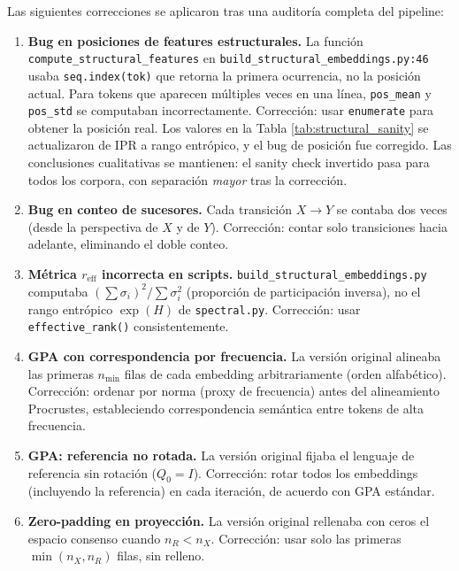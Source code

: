 \documentclass[11pt,a4paper]{article}
\newcommand{\1}{\mathbf{1}}
\numberwithin{equation}{section}
\begin{document}
Las siguientes correcciones se aplicaron tras una auditoría completa del pipeline:

\begin{enumerate}[label=(\roman*)]
    \item \textbf{Bug en posiciones de features estructurales.} La función \texttt{compute\_structural\_features} en \texttt{build\_structural\_embeddings.py:46} usaba \texttt{seq.index(tok)} que retorna la primera ocurrencia, no la posición actual. Para tokens que aparecen múltiples veces en una línea, \texttt{pos\_mean} y \texttt{pos\_std} se computaban incorrectamente. Corrección: usar \texttt{enumerate} para obtener la posición real. Los valores en la Tabla \ref{tab:structural_sanity} se actualizaron de IPR a rango entrópico, y el bug de posición fue corregido. Las conclusiones cualitativas se mantienen: el sanity check invertido pasa para todos los corpora, con separación \emph{mayor} tras la corrección.

    \item \textbf{Bug en conteo de sucesores.} Cada transición $X \to Y$ se contaba dos veces (desde la perspectiva de $X$ y de $Y$). Corrección: contar solo transiciones hacia adelante, eliminando el doble conteo.

    \item \textbf{Métrica $r_{\text{eff}}$ incorrecta en scripts.} \texttt{build\_structural\_embeddings.py} computaba $\left(\sum \sigma_i\right)^2 / \sum \sigma_i^2$ (proporción de participación inversa), no el rango entrópico $\exp(H)$ de \texttt{spectral.py}. Corrección: usar \texttt{effective\_rank()} consistentemente.

    \item \textbf{GPA con correspondencia por frecuencia.} La versión original alineaba las primeras $n_{\min}$ filas de cada embedding arbitrariamente (orden alfabético). Corrección: ordenar por norma (proxy de frecuencia) antes del alineamiento Procrustes, estableciendo correspondencia semántica entre tokens de alta frecuencia.

    \item \textbf{GPA: referencia no rotada.} La versión original fijaba el lenguaje de referencia sin rotación ($Q_0 = I$). Corrección: rotar todos los embeddings (incluyendo la referencia) en cada iteración, de acuerdo con GPA estándar.

    \item \textbf{Zero-padding en proyección.} La versión original rellenaba con ceros el espacio consenso cuando $n_R < n_X$. Corrección: usar solo las primeras $\min(n_X, n_R)$ filas, sin relleno.


\end{enumerate}
\end{document}
